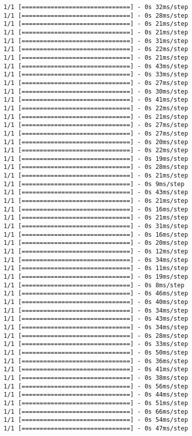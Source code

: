 \documentclass[11pt]{article}
\begin{document}
\begin{Verbatim}[commandchars=\\\{\}]
1/1 [==============================] - 0s 32ms/step
1/1 [==============================] - 0s 28ms/step
1/1 [==============================] - 0s 21ms/step
1/1 [==============================] - 0s 21ms/step
1/1 [==============================] - 0s 31ms/step
1/1 [==============================] - 0s 22ms/step
1/1 [==============================] - 0s 21ms/step
1/1 [==============================] - 0s 43ms/step
1/1 [==============================] - 0s 33ms/step
1/1 [==============================] - 0s 27ms/step
1/1 [==============================] - 0s 30ms/step
1/1 [==============================] - 0s 41ms/step
1/1 [==============================] - 0s 22ms/step
1/1 [==============================] - 0s 21ms/step
1/1 [==============================] - 0s 27ms/step
1/1 [==============================] - 0s 27ms/step
1/1 [==============================] - 0s 20ms/step
1/1 [==============================] - 0s 22ms/step
1/1 [==============================] - 0s 19ms/step
1/1 [==============================] - 0s 28ms/step
1/1 [==============================] - 0s 21ms/step
1/1 [==============================] - 0s 9ms/step
1/1 [==============================] - 0s 43ms/step
1/1 [==============================] - 0s 21ms/step
1/1 [==============================] - 0s 16ms/step
1/1 [==============================] - 0s 21ms/step
1/1 [==============================] - 0s 31ms/step
1/1 [==============================] - 0s 16ms/step
1/1 [==============================] - 0s 20ms/step
1/1 [==============================] - 0s 12ms/step
1/1 [==============================] - 0s 34ms/step
1/1 [==============================] - 0s 11ms/step
1/1 [==============================] - 0s 19ms/step
1/1 [==============================] - 0s 8ms/step
1/1 [==============================] - 0s 46ms/step
1/1 [==============================] - 0s 40ms/step
1/1 [==============================] - 0s 34ms/step
1/1 [==============================] - 0s 43ms/step
1/1 [==============================] - 0s 34ms/step
1/1 [==============================] - 0s 28ms/step
1/1 [==============================] - 0s 33ms/step
1/1 [==============================] - 0s 50ms/step
1/1 [==============================] - 0s 36ms/step
1/1 [==============================] - 0s 41ms/step
1/1 [==============================] - 0s 38ms/step
1/1 [==============================] - 0s 56ms/step
1/1 [==============================] - 0s 44ms/step
1/1 [==============================] - 0s 51ms/step
1/1 [==============================] - 0s 66ms/step
1/1 [==============================] - 0s 54ms/step
1/1 [==============================] - 0s 47ms/step

\end{Verbatim}
\end{document}
